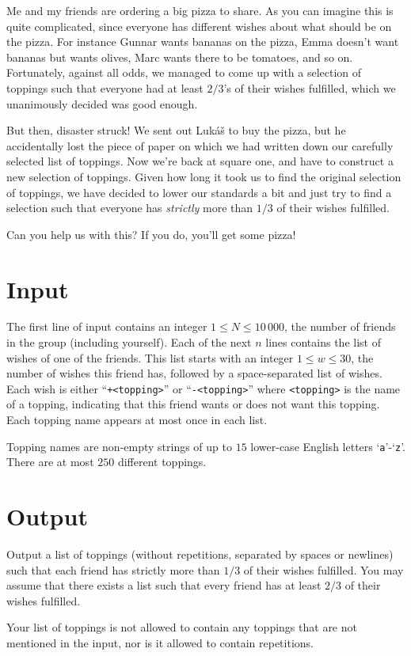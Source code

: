 

\noindent
Me and my friends are ordering a big pizza to share.  As you can
imagine this is quite complicated, since everyone has different wishes
about what should be on the pizza.  For instance Gunnar wants bananas
on the pizza, Emma doesn't want bananas but wants olives, Marc wants
there to be tomatoes, and so on.  Fortunately, against all odds, we
managed to come up with a selection of toppings such that everyone had
at least $2/3$'s of their wishes fulfilled, which we unanimously decided was
good enough.

But then, disaster struck!  We sent out Lukáš to buy the pizza, but he
accidentally lost the piece of paper on which we had written down our
carefully selected list of toppings.  Now we're back at square one,
and have to construct a new selection of toppings.  Given how long it
took us to find the original selection of toppings, we have decided to
lower our standards a bit and just try to find a selection such that
everyone has \emph{strictly} more than $1/3$ of their wishes fulfilled.

Can you help us with this?  If you do, you'll get some pizza!


\section*{Input}

The first line of input contains an integer $1 \le N \le 10\,000$, the
number of friends in the group (including yourself).  Each of the next
$n$ lines contains the list of wishes of one of the friends.  This
list starts with an integer $1 \le w \le 30$, the number of wishes
this friend has, followed by a space-separated list of wishes.  Each
wish is either ``\texttt{+<topping>}'' or ``\texttt{-<topping>}''
where \texttt{<topping>} is the name of a topping, indicating that
this friend wants or does not want this topping.  Each topping name
appears at most once in each list.

Topping names are non-empty strings of up to $15$ lower-case English
letters `\texttt{a}'-`\texttt{z}'.  There are at most $250$ different toppings.

\section*{Output}

Output a list of toppings (without repetitions, separated by spaces or newlines) such that
each friend has strictly more than $1/3$ of their wishes fulfilled.  You may
assume that there exists a list such that every friend has at least $2/3$
of their wishes fulfilled.

Your list of toppings is not allowed to contain any toppings that are
not mentioned in the input, nor is it allowed to contain repetitions.
